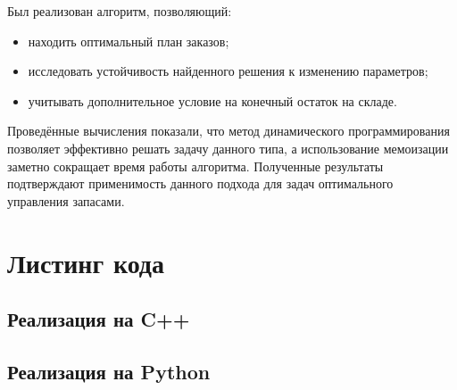 \documentclass[a4paper,12pt]{article}
\begin{document}
Был реализован алгоритм, позволяющий:
\begin{itemize}
    \item находить оптимальный план заказов;
    \item исследовать устойчивость найденного решения к изменению параметров;
    \item учитывать дополнительное условие на конечный остаток на складе.
\end{itemize}

Проведённые вычисления показали, что метод динамического программирования позволяет эффективно решать задачу данного типа, а использование мемоизации заметно сокращает время работы алгоритма. Полученные результаты подтверждают применимость данного подхода для задач оптимального управления запасами.
\appendix
\pagebreak
\section{Листинг кода}

\subsection{Реализация на C++}


\pagebreak
\subsection{Реализация на Python}

\end{document}
